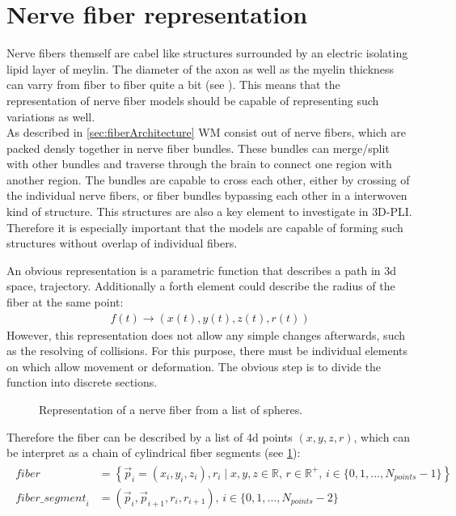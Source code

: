 \section{Nerve fiber representation}
\label{sec:nerve_fiber_representation}
% 
Nerve fibers themself are cabel like structures surrounded by an electric isolating lipid layer of meylin.
The diameter of the axon as well as the myelin thickness can varry from fiber to fiber quite a bit (see \dummy{}).
This means that the representation of nerve fiber models should be capable of representing such variations as well.\\
% 
As described in \cref{sec:fiberArchitecture} \ac{WM} consist out of nerve fibers, which are packed densly together in nerve fiber bundles.
These bundles can merge/split with other bundles and traverse through the brain to connect one region with another region.
The bundles are capable to cross each other, either by crossing of the individual nerve fibers, or fiber bundles bypassing each other in a interwoven kind of structure.
This structures are also a key element to investigate in \ac{3D-PLI}.
Therefore it is especially important that the models are capable of forming such structures without overlap of individual fibers.
\par
% 
An obvious representation is a parametric function that describes a path in 3d space, \ie{} trajectory.
Additionally a forth element could describe the radius of the fiber at the same point:
\begin{align}
f(t) \rightarrow (x(t),y(t), z(t), r(t))
\end{align}
However, this representation does not allow any simple changes afterwards, such as the resolving of collisions.
For this purpose, there must be individual elements on which allow movement or deformation.
The obvious step is to divide the function into discrete sections.
% 
\begin{figure}[!t]
    \setlength{\tikzwidth}{0.85\textwidth}
    \centering
	\caption[]{Representation of a nerve fiber from a list of spheres.}
	\label{fig:fiberReb}
\end{figure}
% 
Therefore the fiber can be described by a list of 4d points $(x,y,z,r)$, which can be interpret as a chain of cylindrical fiber segments (see \cref{fig:fiberReb}):
\begin{align}
\begin{split}
\mathit{fiber} &= \left\{ \vec{p}_i=(x_i,y_i,z_i), r_i \mid x,y,z \in \mathbb{R}, \, r \in \mathbb{R^+}, \, i \in \{0,1,...,N_{\mathit{points}}-1\}\right\} \\
\mathit{fiber\_segment}_i &= (\vec{p}_i, \vec{p}_{i+1}, r_i, r_{i+1}), \, i \in \{0,1,...,N_{\mathit{points}}-2\}
\end{split}
\end{align}
